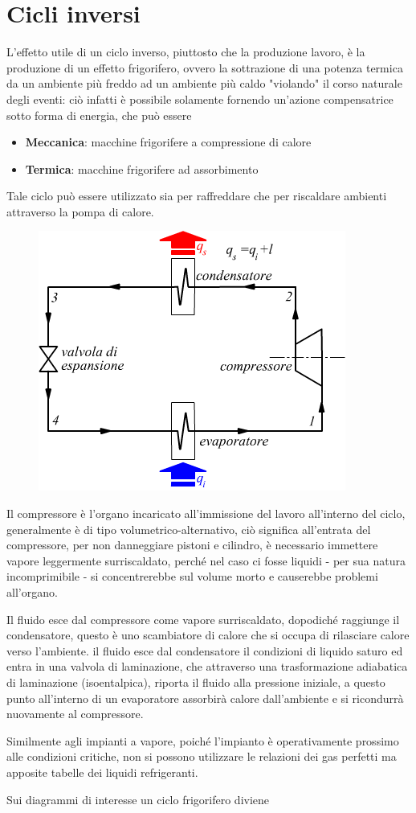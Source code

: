 \part{Cicli inversi}
\begin{adjustwidth}{2in}{}
	L'effetto utile di un ciclo inverso, piuttosto che la produzione lavoro, è la produzione di un effetto frigorifero, ovvero la sottrazione di una potenza termica da un ambiente più freddo ad un ambiente più caldo "violando" il corso naturale degli eventi: ciò infatti è possibile solamente fornendo un'azione compensatrice sotto forma di energia, che può essere 
	\begin{itemize}
		\item \textbf{Meccanica}: macchine frigorifere a compressione di calore
		\item \textbf{Termica}: macchine frigorifere ad assorbimento
	\end{itemize}
	Tale ciclo può essere utilizzato sia per raffreddare che per riscaldare ambienti attraverso la pompa di calore. 		
\begin{figure}[H]
	\centering
	\includegraphics[width=0.4\linewidth]{immagini/cicliinversi}
	\label{fig:cicliinversi}
\end{figure}
	Il compressore è l'organo incaricato all'immissione del lavoro all'interno del ciclo, generalmente è di tipo volumetrico-alternativo, ciò significa all'entrata del compressore, per non danneggiare pistoni e cilindro, è necessario immettere vapore leggermente surriscaldato, perché nel caso ci fosse liquidi - per sua natura incomprimibile - si concentrerebbe sul volume morto e causerebbe problemi all'organo. 
	
	Il fluido esce dal compressore come vapore surriscaldato, dopodiché raggiunge il condensatore, questo è uno scambiatore di calore che si occupa di rilasciare calore verso l'ambiente. il fluido esce dal condensatore il condizioni di liquido saturo ed entra in una valvola di laminazione, che attraverso una trasformazione adiabatica di laminazione (isoentalpica), riporta il fluido alla pressione iniziale, a questo punto all'interno di un evaporatore assorbirà calore dall'ambiente e si ricondurrà nuovamente al compressore.
	
	Similmente agli impianti a vapore, poiché l'impianto è operativamente prossimo alle condizioni critiche, non si possono utilizzare le relazioni dei gas perfetti ma apposite tabelle dei liquidi refrigeranti. \newline 
	
	Sui diagrammi di interesse un ciclo frigorifero diviene 
\end{adjustwidth}		
